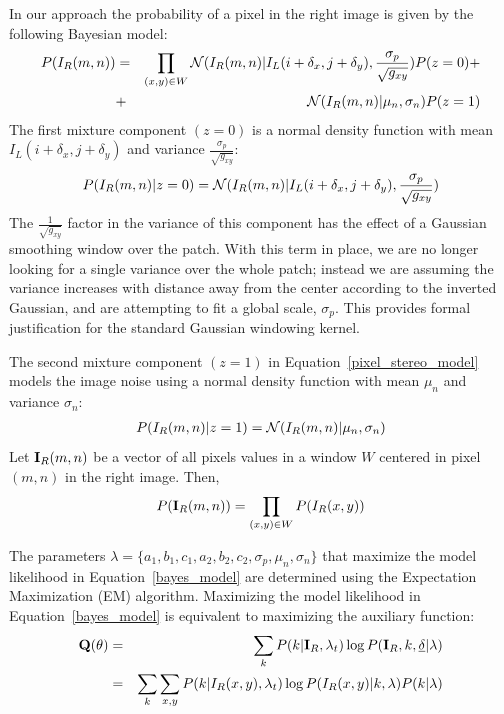 In our approach the probability of a pixel in the right image is given
by the following Bayesian model:
\begin{eqnarray}
P(I_R(m,n))&=& \prod_{(x,y)\in W}{\cal N}(I_R(m,n)|I_L(i+\delta_x, j+\delta_y), \frac{\sigma_p}{\sqrt{g_{xy}}})P(z=0) + \\
\nonumber
           &+& {\cal N}(I_R(m,n)|\mu_n, \sigma_n)P(z=1)
\label{pix}
\end {eqnarray}
The first mixture component $(z=0)$ is a normal density function with
mean $I_L(i+\delta_x, j+\delta_y)$ and variance $\frac{\sigma_p}{\sqrt{g_{xy}}}$:
\begin{eqnarray}
P(I_R(m,n)|z=0) = {\cal N}(I_R(m,n)|I_L(i+\delta_x, j+\delta_y), \frac{\sigma_p}{\sqrt{g_{xy}}})
\label{pixel_stereo_model}
\end {eqnarray}
The $\frac{1}{\sqrt{g_{xy}}}$ factor in the variance of this component
has the effect of a Gaussian smoothing window over the patch. With
this term in place, we are no longer looking for a single variance
over the whole patch; instead we are assuming the variance increases
with distance away from the center according to the inverted Gaussian,
and are attempting to fit a global scale, $\sigma_p$. This provides
formal justification for the standard Gaussian windowing kernel.

The second mixture component $(z=1)$ in
Equation~\ref{pixel_stereo_model} models the image noise using a
normal density function with mean $\mu_n$ and variance $\sigma_n$:
\begin{eqnarray}
P(I_R(m,n)|z=1) = {\cal N}(I_R(m,n)|\mu_n, \sigma_n)
\label{pixel_noise_model}
\end {eqnarray}
Let ${\bf I}_R(m,n)$ be a vector of all pixels values in a window $W$
centered in pixel $(m,n)$ in the right image. Then,
\begin{eqnarray}
P({\bf I}_R(m,n)) = \prod_{(x,y)\in W}P(I_R(x,y))
\label{bayes_model}
\end {eqnarray}

The parameters $\lambda = \{a_1, b_1, c_1, a_2, b_2, c_2,
\sigma_p,\mu_n, \sigma_n\}$ that maximize the model likelihood in
Equation~\ref{bayes_model} are determined using the Expectation
Maximization (EM) algorithm. Maximizing the model likelihood in
Equation~\ref{bayes_model} is equivalent to maximizing the auxiliary
function:
\begin{eqnarray}
\nonumber
{\bf Q(\theta)}&=& \sum_k P(k|{\bf I}_R, \lambda_t) \log P ({\bf I}_R, k, {\underline \delta}|\lambda)\\
&=& \sum_{k}\sum_{x,y} P(k|I_R(x,y), \lambda_t)\log P (I_R(x,y)|k, \lambda)P(k|\lambda)
\label{aux_function}
\end {eqnarray}

